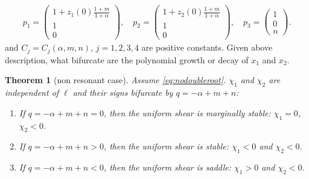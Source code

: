 \documentclass[a4paper,11pt]{article}
\newtheorem{theorem}{Theorem}
\theoremstyle{remark}
\begin{document}
\begin{align*}
  p_1=\begin{pmatrix} 1+z_1(0)\frac{1+m}{1+\alpha} \\ 1 \\  0 \end{pmatrix}, \quad 
  p_2 = \begin{pmatrix} 1+z_2(0)\frac{1+m}{1+\alpha} \\ 1  \\ 0 \end{pmatrix}, \quad 
  p_3 = \begin{pmatrix} 1 \\ 0 \\ n \end{pmatrix}.
 \end{align*} 
and $C_j=C_j(\alpha,m,n)$, $j=1,2,3,4$ are positive constants. Given above description, what bifurcate are the polynomial growth or decay of $x_1$ and $x_2$.
\begin{theorem}[non resonant case] \label{thm:1} Assume \eqref{eq:nodoubleroot}. $\chi_1$ and $\chi_2$ are independent of $\ell$ and their signs bifurcate by $q=-\alpha+m+n$:
 \begin{enumerate}
  \item If $q=-\alpha+m+n=0$, then the uniform shear is marginally stable: $\chi_1=0$, $\chi_2<0$.
  \item If $q=-\alpha+m+n>0$, then the uniform shear is stable: $\chi_1<0$ and $\chi_2<0$.
  \item If $q=-\alpha+m+n<0$, then the uniform shear is saddle: $\chi_1>0$ and $\chi_2<0$.
 \end{enumerate}
\end{theorem}
\end{document}
